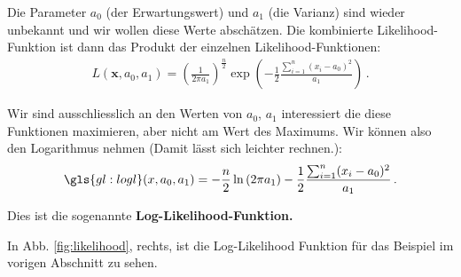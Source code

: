 Die Parameter $a_0$ (der Erwartungswert) und $a_1$ (die Varianz) sind wieder unbekannt und wir wollen diese Werte absch\"atzen. Die kombinierte Likelihood-Funktion ist dann das Produkt der einzelnen Likelihood-Funktionen:
\begin{align}
L(\boldsymbol{x}, a_0, a_1) =  \left( \frac{1}{ 2 \pi a_1 } \right)^\frac{n}{2} \exp \left( - \frac{1}{2} \frac{ \sum_{i=1}^n (x_i - a_0)^2 }{ a_1 } \right)\,.
\label{eq:vl8-9}
\end{align}

Wir sind ausschliesslich an den Werten von $a_0$, $a_1$ interessiert die diese Funktionen maximieren, aber nicht am Wert des Maximums. Wir k\"onnen also den Logarithmus nehmen (Damit l\"asst sich leichter rechnen.):
\begin{align}
\gls{gl:logl}(x, a_0, a_1) = - \frac{n}{2} \ln{ ( 2 \pi a_1 ) } - \frac{1}{2} \frac{ \sum_{i=1}^n (x_i - a_0)^2 }{ a_1 }\,.
\label{eq:vl8-10}
\end{align}

\begin{center}
\begin{tcolorbox}[enhanced,width=6in,drop fuzzy shadow southwest,
    colframe=red!50!black,colback=red!05]
   Dies ist die sogenannte \textbf{Log-Likelihood-Funktion. }
\end{tcolorbox}
\end{center}

In Abb. \ref{fig:likelihood}, rechts, ist die Log-Likelihood Funktion für das Beispiel im vorigen Abschnitt zu sehen. \\

